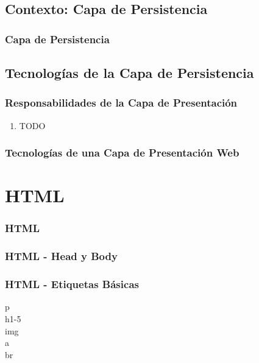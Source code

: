 \documentclass[a4paper,slidestop,xcolor=pst,blue]{beamer}
\begin{document}
\subsection{Contexto: Capa de Persistencia}

\begin{frame}
    \frametitle{Capa de Persistencia}
\end{frame}

\subsection{Tecnologías de la Capa de Persistencia}

\begin{frame}[c]
	\frametitle{Responsabilidades de la Capa de Presentación}
	\begin{enumerate}[<+->]
        \item TODO
	\end{enumerate}
\end{frame}

\begin{frame}[c]
    \frametitle{Tecnologías de una Capa de Presentación Web}
\end{frame}

\section{HTML}

\begin{frame}[c]
    \frametitle{HTML}
\end{frame}

\begin{frame}[c]
    \frametitle{HTML - Head y Body}
\end{frame}

\begin{frame}[c]
    \frametitle{HTML - Etiquetas Básicas}
    \begin{description}
        \item[p]
        \item[h1-5]
        \item[img] 
        \item[a]
        \item[br]
    \end{description}
\end{frame}
\end{document}
